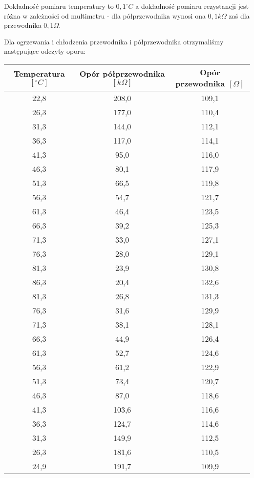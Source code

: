 \documentclass[10pt,a4paper]{article}
\newcommand{\forceindent}{\leavevmode{\parindent=3em\indent}}
\begin{document}
\forceindent Dokładność pomiaru temperatury to $0,1 ^{\circ}C$ a dokładność pomiaru rezystancji jest różna w zależności od multimetru - dla półprzewodnika wynosi ona $0,1 k\Omega$ zaś dla przewodnika $0,1 \Omega$.


\forceindent Dla ogrzewania i chłodzenia przewodnika i półprzewodnika otrzymaliśmy następujące odczyty oporu:\\
\vspace{10pt}
\begin{center}
\begin{tabular}{|c|c|c|}
\multicolumn{1}{c}{Temperatura $[^{\circ}C]$} & \multicolumn{1}{c}{Opór półprzewodnika $[k\Omega]$} & \multicolumn{1}{c}{Opór przewodnika $[\Omega]$}\\
\hline
22,8&208,0&109,1\\ 
 \hline 
26,3&177,0&110,4\\ 
 \hline 
31,3&144,0&112,1\\ 
 \hline 
36,3&117,0&114,1\\ 
 \hline 
41,3&95,0&116,0\\ 
 \hline 
46,3&80,1&117,9\\ 
 \hline 
51,3&66,5&119,8\\ 
 \hline 
56,3&54,7&121,7\\ 
 \hline 
61,3&46,4&123,5\\ 
 \hline 
66,3&39,2&125,3\\ 
 \hline 
71,3&33,0&127,1\\ 
 \hline 
76,3&28,0&129,1\\ 
 \hline 
81,3&23,9&130,8\\ 
 \hline 
86,3&20,4&132,6\\ 
 \hline 
81,3&26,8&131,3\\ 
 \hline 
76,3&31,6&129,9\\ 
 \hline 
71,3&38,1&128,1\\ 
 \hline 
66,3&44,9&126,4\\ 
 \hline 
61,3&52,7&124,6\\ 
 \hline 
56,3&61,2&122,9\\ 
 \hline 
51,3&73,4&120,7\\ 
 \hline 
46,3&87,0&118,6\\ 
 \hline 
41,3&103,6&116,6\\ 
 \hline 
36,3&124,7&114,6\\ 
 \hline 
31,3&149,9&112,5\\ 
 \hline 
26,3&181,6&110,5\\ 
 \hline 
24,9&191,7&109,9\\ 
 \hline 

\end{tabular}
\end{center}
\end{document}
